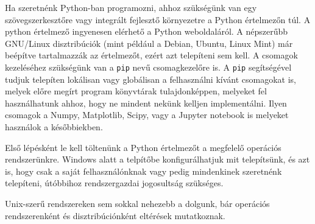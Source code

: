 
Ha szeretnénk Python-ban programozni, ahhoz szükségünk van egy
szövegszerkesztőre vagy integrált fejlesztő környezetre a Python
értelmezőn túl. A python értelmező ingyenesen elérhető a Python
weboldaláról. A népszerűbb GNU/Linux disztribúciók (mint például a Debian, Ubuntu, Linux Mint) már beépítve tartalmazzák az értelmezőt, ezért azt telepíteni
sem kell. A csomagok kezeléséhez szükségünk van a \texttt{pip} nevű
csomagkezelőre is. A \texttt{pip} segítségével tudjuk telepíten
lokálisan vagy globálisan a felhasználni kívánt csomagokat is, melyek
előre megírt program könyvtárak tulajdonképpen, melyeket fel
használhatunk ahhoz, hogy ne mindent nekünk kelljen implementálni. Ilyen
csomagok a Numpy, Matplotlib, Scipy, vagy a Jupyter notebook is melyeket
használok a későbbiekben.


    Első lépésként le kell töltenünk a Python értelmezőt a megfelelő
operációs rendszerünkre. Windows alatt a telpítőbe konfigurálhatjuk mit
telepítsünk, és azt is, hogy csak a saját felhasználónknak vagy pedig
mindenkinek szeretnénk telepíteni, útóbbihoz rendszergazdai jogosultság
szükséges.

Unix-szerű rendszereken sem sokkal nehezebb a dolgunk, bár operációs
rendszerenként és disztribúciónként eltérések mutatkoznak.

